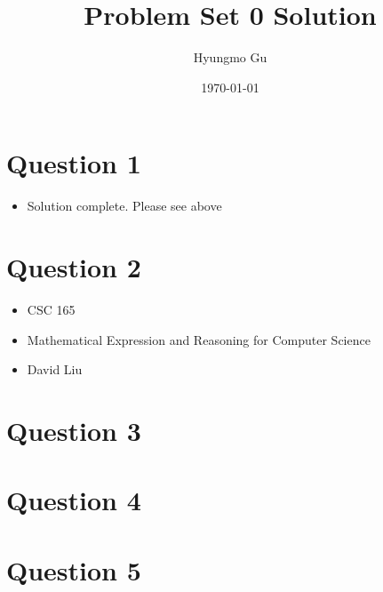 \documentclass[12pt]{article}
\begin{document}
\title{Problem Set 0 Solution}
\author{Hyungmo Gu}
\date{\today}
\maketitle

\section*{Question 1}
    \begin{itemize}
        \item Solution complete. Please see above
    \end{itemize}

\section*{Question 2}
    \begin{itemize}
        \item CSC 165
        \item Mathematical Expression and Reasoning for Computer Science
        \item David Liu
    \end{itemize}

\section*{Question 3}

\section*{Question 4}

\section*{Question 5}
\end{document}
